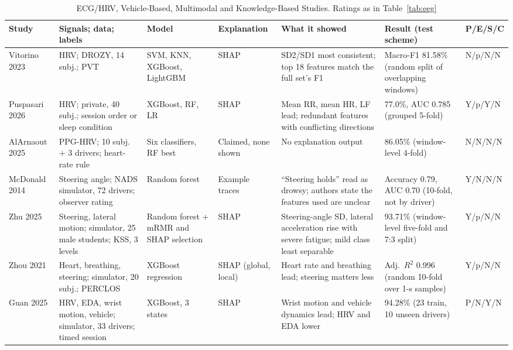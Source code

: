 \begin{table}[!t]
\centering
\caption{ECG/HRV, Vehicle-Based, Multimodal and Knowledge-Based Studies. Ratings as in Table~\ref{tab:eeg}}
\label{tab:cardiac}
\scriptsize
\setlength{\tabcolsep}{3pt}
\begin{tabularx}{\textwidth}{@{}L{1.7cm}L{2.7cm}L{2.2cm}L{2.2cm}YL{3cm}L{1.05cm}@{}}
\toprule
\textbf{Study} & \textbf{Signals; data; labels} & \textbf{Model} & \textbf{Explanation} & \textbf{What it showed} & \textbf{Result (test scheme)} & \textbf{P/E/S/C} \\
\midrule
Vitorino 2023 \cite{vitorino2023adversarial} & HRV; DROZY, 14 subj.; PVT & SVM, KNN, XGBoost, LightGBM & SHAP & SD2/SD1 most consistent; top 18 features match the full set's F1 & Macro-F1 81.58\% (random split of overlapping windows) & N/p/N/N \\
Puspasari 2026 \cite{puspasari2026predicting} & HRV; private, 40 subj.; session order or sleep condition & XGBoost, RF, LR & SHAP & Mean RR, mean HR, LF lead; redundant features with conflicting directions & 77.0\%, AUC 0.785 (grouped 5-fold) & Y/p/Y/N \\
AlArnaout 2025 \cite{alarnaout2025exploiting} & PPG-HRV; 10 subj. + 3 drivers; heart-rate rule & Six classifiers, RF best & Claimed, none shown & No explanation output & 86.05\% (window-level 4-fold) & N/N/N/N \\
McDonald 2014 \cite{mcdonald2014steering} & Steering angle; NADS simulator, 72 drivers; observer rating & Random forest & Example traces & ``Steering holds'' read as drowsy; authors state the features used are unclear & Accuracy 0.79, AUC 0.70 (10-fold, not by driver) & Y/N/N/N \\
Zhu 2025 \cite{zhu2025madfm} & Steering, lateral motion; simulator, 25 male students; KSS, 3 levels & Random forest + mRMR and SHAP selection & SHAP & Steering-angle SD, lateral acceleration rise with severe fatigue; mild class least separable & 93.71\% (window-level five-fold and 7:3 split) & Y/p/N/N \\
Zhou 2021 \cite{zhou2021predicting} & Heart, breathing, steering; simulator, 20 subj.; PERCLOS & XGBoost regression & SHAP (global, local) & Heart rate and breathing lead; steering matters less & Adj.\ $R^2$ 0.996 (random 10-fold over 1-s samples) & Y/p/N/N \\
Guan 2025 \cite{guan2025fatigue} & HRV, EDA, wrist motion, vehicle; simulator, 33 drivers; timed session & XGBoost, 3 states & SHAP & Wrist motion and vehicle dynamics lead; HRV and EDA lower & 94.28\% (23 train, 10 unseen drivers) & P/N/Y/N \\

\end{tabularx}
\end{table}
